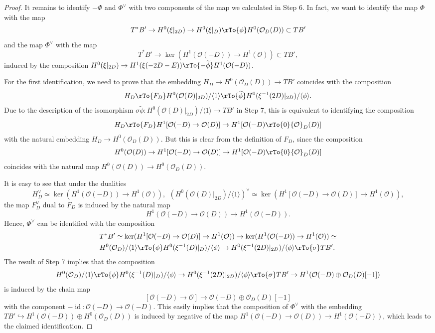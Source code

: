 \documentclass[reqno]{amsart}
\theoremstyle{definition}
\theoremstyle{remark}
\newcommand{\hra}{\hookrightarrow}
\newcommand{\wt}{\widetilde}
\newcommand{\OO}{{\mathcal O}}
\newcommand{\si}{\sigma}
\newcommand{\sub}{\subset}
\newcommand{\id}{\operatorname{id}}
\newcommand{\lan}{\langle}
\newcommand{\ran}{\rangle}
\numberwithin{equation}{section}
\begin{document}
\begin{proof}
It remains to identify $-\Phi$ and $\Phi^\vee$ with two components of the map we calculated in Step 6.
In fact, we want to identify the map $\Phi$ with the map 
$$T^*B'\to H^0(\xi|_{2D})\to H^0(\xi|_D)\rTo{\phi}H^0(\OO_D(D))\sub TB'$$
and the map $\Phi^\vee$ with the map
$$T^*B'\to \ker(H^1(\OO(-D))\to H^1(\OO))\sub TB',$$
induced by the composition $H^0(\xi|_{2D})\to H^1(\xi(-2D-E))\rTo{-\wt{\phi}} H^1(\OO(-D))$.

For the first identification, we need to prove that the embedding $H_D\to H^0(\OO_D(D))\to TB'$ coincides with the composition
$$H_D\rTo{F_D}H^0(\OO(D)|_{2D})/\lan 1\ran\rTo{\wt{\phi}} H^0(\xi^{-1}(2D)|_{2D})/\lan \phi\ran.$$
Due to the description of the isomorphism $\si\wt{\phi}:H^0(\OO(D)|_{2D})/\lan 1\ran\to TB'$ in Step 7, this is equivalent to identifying the composition
$$H_D\rTo{F_D} H^1[\OO(-D)\to \OO(D)]\to H^1[\OO(-D)\rTo{0} \OO_D(D)]$$
with the natural embedding $H_D\to H^0(\OO_D(D))$. But this is clear from the definition of $F_D$, since the composition 
$$H^0(\OO(D))\to H^1[\OO(-D)\to \OO(D)]\to H^1[\OO(-D)\rTo{0} \OO_D(D)]$$
coincides with the natural map $H^0(\OO(D))\to H^0(\OO_D(D))$.
 
It is easy to see that under the dualities
$$H_D^\vee\simeq \ker(H^1(\OO(-D))\to H^1(\OO)), \ \ (H^0(\OO(D)|_{2D})/\lan 1\ran)^\vee\simeq \ker(H^1[\OO(-D)\to \OO(D)]\to H^1(\OO)),$$
the map $F_D^\vee$ dual to $F_D$ is induced by the natural map
$$H^1(\OO(-D)\to \OO(D))\to H^1(\OO(-D)).$$ 
Hence, $\Phi^\vee$ can be identified with the composition
\begin{align*}
&T^*B'\simeq \ker(H^1[\OO(-D)\to \OO(D)]\to H^1(\OO))\to \ker(H^1(\OO(-D))\to H^1(\OO))\simeq \\
&H^0(\OO_D)/\lan 1\ran\rTo{\phi} H^0(\xi^{-1}(D)|_D)/\lan \phi\ran\to H^0(\xi^{-1}(2D)|_{2D})/\lan \phi\ran\rTo{\si} TB'.
\end{align*} 
The result of Step 7 implies that the composition 
$$H^0(\OO_D)/\lan 1\ran \rTo{\phi} H^0(\xi^{-1}(D)|_D)/\lan \phi\ran\to H^0(\xi^{-1}(2D)|_{2D})/\lan \phi\ran\rTo{\si} TB'\to H^1(\OO(-D)\oplus \OO_D(D)[-1])$$
is induced by the chain map 
$$[\OO(-D)\to \OO]\to \OO(-D)\oplus \OO_D(D)[-1]$$
with the component $-\id:\OO(-D)\to \OO(-D)$.
This easily implies that the composition of $\Phi^\vee$ with the embedding $TB'\hra H^1(\OO(-D))\oplus H^0(\OO_D(D))$ is induced by negative of the map
$H^1(\OO(-D)\to \OO(D))\to H^1(\OO(-D))$, which leads to the claimed identification.
\end{proof}

\end{document}
